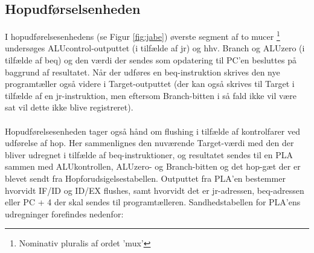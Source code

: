 \documentclass[10pt,a4paper,danish]{article}
\begin{document}
\subsection{Hopudførselsenheden}
I hopudførelsesenhedens (se Figur \ref{fig:jabe}) øverste segment af to mucer
\footnote{Nominativ pluralis af ordet 'mux'} undersøges ALUcontrol-outputtet 
(i tilfælde af jr) og hhv. Branch og ALUzero (i tilfælde af beq) og den værdi 
der sendes som opdatering til PC'en besluttes på baggrund af resultatet. Når 
der udføres en beq-instruktion skrives den nye programtæller også videre i 
Target-outputtet (der kan også skrives til Target i tilfælde af en jr-instruktion,
men eftersom Branch-bitten i så fald ikke vil være sat vil dette ikke blive registreret).

\paragraph{}
Hopudførelsesenheden tager også hånd om flushing i tilfælde af kontrolfarer
ved udførelse af hop. Her sammenlignes den nuværende Target-værdi med den
der bliver udregnet i tilfælde af beq-instruktioner, og resultatet
sendes til en PLA sammen med ALUkontrollen, ALUzero- og Branch-bitten og 
det hop-gæt der er blevet sendt fra Hopforudsigelsestabellen. Outputtet
fra PLA'en bestemmer hvorvidt IF/ID og ID/EX flushes, samt hvorvidt det er
jr-adressen, beq-adressen eller PC + 4 der skal sendes til programtælleren. 
Sandhedstabellen for PLA'ens udregninger forefindes nedenfor:
\end{document}
